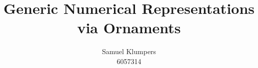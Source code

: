 \documentclass[10pt]{article}
\title{Generic Numerical Representations via Ornaments}
\author{Samuel Klumpers\\6057314}
\theoremstyle{plain}
\theoremstyle{definition}
\newcommand{\towrite}[1]{\todo[color=cyan]{#1}}
\newcommand{\lowprio}[1]{\todo[color=nondescriptyellow]{#1}}
\begin{document}
\maketitle


\begin{comment}
    The dependently typed functional programming language Agda encourages defining custom datatypes to write correct-by-construction programs with\todo{long}. In some cases, even those datatypes can be made correct-by-construction, by manually distilling them from a mixture of requirements, as opposed to pulling them out of thin air\todo{distracted}. This is in particular the case for numerical representations, a class of datastructures inspired by number systems, containing structures such as linked lists and binary trees. However, constructing datatypes in this manner, and establishing the necessary relations between them can quickly become tedious and duplicative.

    In the general case, employing datatype-generic programming can curtail code-duplication by allowing the definition of constructions that can be instantiated to a class of types. Furthermore, ornaments make it possible to succinctly describe relations between structurally similar types.
    
    In this thesis, we apply generic programming and ornaments to numerical representations, giving a recipe to compute such a representation from a provided number system.
    For this, we describe a generic universe and a type of ornaments on it, allowing us to formulate the recipe as an ornament from a number system to the computed datatype.
    
    
    Todo legend:
    \todo{To do}
    \towrite{There is something missing here}
    \lowprio{General and vague self-criticism, might ignore. Might do something if I have time on my hands.}
\end{abstract}


\begin{comment}
    This thesis explains the concepts numerical representations and ornaments, and aims to combine these to simplify the presentation and verification of finger trees. We demonstrate the generalizability and easier verification of the resulting code. Further, we also investigate to which extent descriptions and ornaments, and generic programs built on top of these, remain effective in a setting without axiom K.
\end{comment}


\newpage
\tableofcontents
\end{document}
